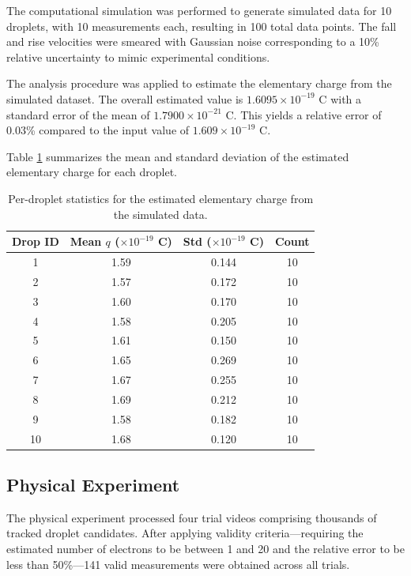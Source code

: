 \documentclass[%
 reprint,
 amsmath,amssymb,
 aps,
]{revtex4-2}
\begin{document}
The computational simulation was performed to generate simulated data for 10 droplets, with 10 measurements each, resulting in 100 total data points. The fall and rise velocities were smeared with Gaussian noise corresponding to a 10\% relative uncertainty to mimic experimental conditions.

The analysis procedure was applied to estimate the elementary charge from the simulated dataset. The overall estimated value is $1.6095 \times 10^{-19}$ C with a standard error of the mean of $1.7900 \times 10^{-21}$ C. This yields a relative error of 0.03\% compared to the input value of $1.609 \times 10^{-19}$ C.

Table \ref{tab:per_drop_sim} summarizes the mean and standard deviation of the estimated elementary charge for each droplet.

\begin{table}[h]
\centering
\begin{tabular}{|c|c|c|c|}
\hline
\textbf{Drop ID} & \textbf{Mean $q$ ($\times 10^{-19}$ C)} & \textbf{Std ($ \times 10^{-19}$ C)} & \textbf{Count} \\
\hline
1 & 1.59 & 0.144 & 10 \\
2 & 1.57 & 0.172 & 10 \\
3 & 1.60 & 0.170 & 10 \\
4 & 1.58 & 0.205 & 10 \\
5 & 1.61 & 0.150 & 10 \\
6 & 1.65 & 0.269 & 10 \\
7 & 1.67 & 0.255 & 10 \\
8 & 1.69 & 0.212 & 10 \\
9 & 1.58 & 0.182 & 10 \\
10 & 1.68 & 0.120 & 10 \\
\hline
\end{tabular}
\caption{Per-droplet statistics for the estimated elementary charge from the simulated data.}
\label{tab:per_drop_sim}
\end{table}

\subsection{Physical Experiment}
The physical experiment processed four trial videos comprising thousands of tracked droplet candidates. After applying validity criteria---requiring the estimated number of electrons to be between 1 and 20 and the relative error to be less than 50\%---141 valid measurements were obtained across all trials.
\end{document}
